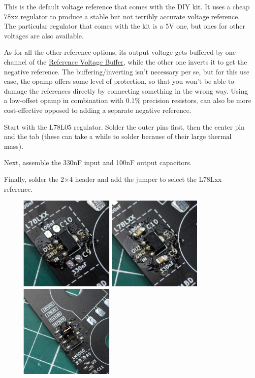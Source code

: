 \documentclass[12pt, a4paper]{article}
\begin{document}
This is the default voltage reference that comes with the DIY kit. It uses a cheap 78xx
regulator to produce a stable but not terribly accurate voltage reference. The particular
regulator that comes with the kit is a 5V one, but ones for other voltages are also available.

As for all the other reference options, its output voltage gets buffered by one channel
of the \hyperref[sec:reference_voltage_buffer]{Reference Voltage Buffer}, while the other one
inverts it to get the negative reference. The buffering/inverting isn't necessary per se, but
for this use case, the opamp offers some level of protection, so that you won't be able to
damage the references directly by connecting something in the wrong way. Using a low-offset
opamp in combination with 0.1\% precision resistors, can also be more cost-effective opposed
to adding a separate negative reference.

Start with the L78L05 regulator. Solder the outer pins first, then the center pin and the tab
(these can take a while to solder because of their large thermal mass).

Next, assemble the 330nF input and 100nF output capacitors.

Finally, solder the 2×4 header and add the jumper to select the L78Lxx reference.

\begin{figure}[H]
    \centering
    \includegraphics[width=46mm]{images/section_1-5_regulator.jpg}
    \hspace{2mm}
    \includegraphics[width=46mm]{images/section_1-5_capacitors.jpg}
    \hspace{2mm}
    \includegraphics[width=46mm]{images/section_1-5_header.jpg}
\end{figure}
\end{document}

